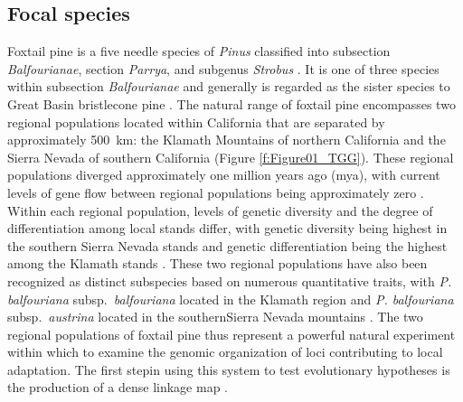 \documentclass[11pt]{article}
\begin{document}
\subsection*{Focal species}
Foxtail pine is a five needle species of \textit{Pinus} classified into 
subsection \textit{Balfourianae}, section \textit{Parrya}, and subgenus \textit{Strobus} 
\citep{Gernandt:2005}. It is one of three species within subsection \textit{Balfourianae} 
\citep{Bailey:1970} and generally is regarded as the sister species to Great Basin bristlecone 
pine \citep[\textit{P. longaeva} D. K. Bailey; see][] {Eckert:2006a}. The natural range of foxtail pine encompasses two 
regional populations located within California that are separated by approximately \SI{500}{km}:  
the Klamath Mountains of northern California and the Sierra Nevada of southern California 
(Figure \ref{f:Figure01_TGG}). These regional populations diverged approximately one million years ago (mya), 
with current levels of gene flow between regional populations being approximately zero 
\citep{Eckert:2008}. Within each regional population, levels of genetic diversity and the 
degree of differentiation among local stands differ, with genetic diversity being highest in 
the southern Sierra Nevada stands and genetic differentiation being the highest among the 
Klamath stands \citep{Oline:2000, Eckert:2008}. These two regional populations
have also been recognized as distinct subspecies based on numerous quantitative traits, with \textit{P. balfouriana}
subsp.\ \textit{balfouriana} located in the Klamath region and \textit{P. balfouriana} subsp.\ \textit{austrina} located 
in the southernSierra Nevada mountains \citep{Mastrogiuseppe:1980}. The two regional populations of foxtail pine 
thus represent a powerful natural experiment within which to examine the genomic organization of loci contributing to 
local adaptation. The first stepin using this system to test evolutionary hypotheses is the production of a
dense linkage map \citep[cf.][]{Pannell:2013}.
\end{document}
